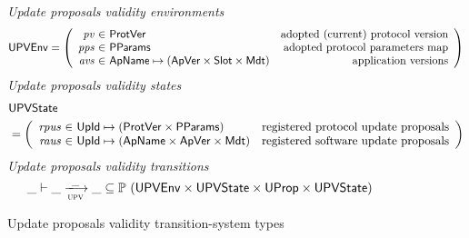 \begin{figure}[htb]
  \emph{Update proposals validity environments}
  \begin{equation*}
    \UPVEnv =
    \left(
      \begin{array}{r@{~\in~}lr}
        \var{pv} & \ProtVer & \text{adopted (current) protocol version}\\
        \var{pps} & \PPMMap & \text{adopted protocol parameters map}\\
        \var{avs} & \ApName \mapsto (\ApVer \times \Slot \times \Metadata)
        & \text{application versions}\\
      \end{array}
    \right)
  \end{equation*}
  \emph{Update proposals validity states}
  \begin{align*}
    & \UPVState \\
    & = \left(
      \begin{array}{r@{~\in~}lr}
        \var{rpus} & \UPropId \mapsto (\ProtVer \times \PPMMap)
        & \text{registered protocol update proposals}\\
        \var{raus} & \UPropId \mapsto (\ApName \times \ApVer \times \Metadata)
        & \text{registered software update proposals}\\
      \end{array}
    \right)
  \end{align*}
  \emph{Update proposals validity transitions}
    \begin{equation*}
    \var{\_} \vdash
    \var{\_} \trans{upv}{\_} \var{\_}
    \subseteq \powerset (\UPVEnv \times \UPVState \times \UProp \times \UPVState)
  \end{equation*}
  \caption{Update proposals validity transition-system types}
  \label{fig:ts-types:up-validity}
\end{figure}

